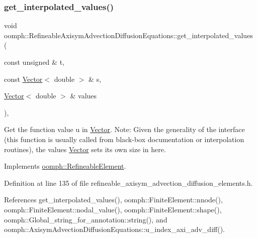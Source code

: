 \subsubsection{\texorpdfstring{get\+\_\+interpolated\+\_\+values()}{get\_interpolated\_values()}\hspace{0.1cm}{\footnotesize\ttfamily [2/2]}}
{\footnotesize\ttfamily void oomph\+::\+Refineable\+Axisym\+Advection\+Diffusion\+Equations\+::get\+\_\+interpolated\+\_\+values (\begin{DoxyParamCaption}\item[{const unsigned \&}]{t,  }\item[{const \hyperlink{classoomph_1_1Vector}{Vector}$<$ double $>$ \&}]{s,  }\item[{\hyperlink{classoomph_1_1Vector}{Vector}$<$ double $>$ \&}]{values }\end{DoxyParamCaption})\hspace{0.3cm}{\ttfamily [inline]}, {\ttfamily [virtual]}}



Get the function value u in \hyperlink{classoomph_1_1Vector}{Vector}. Note\+: Given the generality of the interface (this function is usually called from black-\/box documentation or interpolation routines), the values \hyperlink{classoomph_1_1Vector}{Vector} sets its own size in here. 



Implements \hyperlink{classoomph_1_1RefineableElement_ada6f0efe831ffefb1d2829ce01d45bfc}{oomph\+::\+Refineable\+Element}.



Definition at line 135 of file refineable\+\_\+axisym\+\_\+advection\+\_\+diffusion\+\_\+elements.\+h.



References get\+\_\+interpolated\+\_\+values(), oomph\+::\+Finite\+Element\+::nnode(), oomph\+::\+Finite\+Element\+::nodal\+\_\+value(), oomph\+::\+Finite\+Element\+::shape(), oomph\+::\+Global\+\_\+string\+\_\+for\+\_\+annotation\+::string(), and oomph\+::\+Axisym\+Advection\+Diffusion\+Equations\+::u\+\_\+index\+\_\+axi\+\_\+adv\+\_\+diff().

\mbox{\label{classoomph_1_1RefineableAxisymAdvectionDiffusionEquations_a1027fd155ab295492c9e4f4859e91b30}} 
